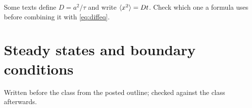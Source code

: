 \documentclass[11pt]{article}
\begin{document}
\begin{caution}\label{caut:dconv}
Some texts define $D=a^2/\tau$ and write $\langle x^2 \rangle=Dt$. Check which one a
formula uses before combining it with \eqref{eq:diffeq}.
\end{caution}


\section{Steady states and boundary conditions}\label{sec:steady}

Written before the class from the posted outline; checked against the class
afterwards.

\label{lec:end}
\end{document}
